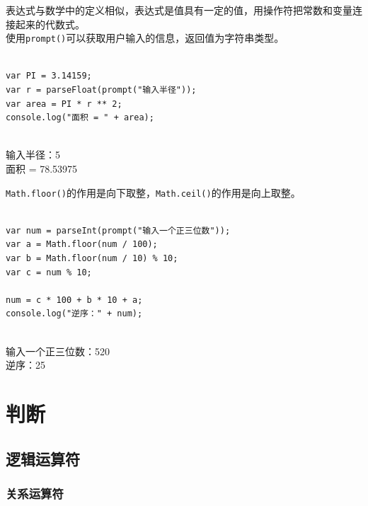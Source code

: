 表达式与数学中的定义相似，表达式是值具有一定的值，用操作符把常数和变量连接起来的代数式。 \\

使用\lstinline|prompt()|可以获取用户输入的信息，返回值为字符串类型。 \\

 \\

\begin{lstlisting}[style=htmlcssjs]
var PI = 3.14159;
var r = parseFloat(prompt("输入半径"));
var area = PI * r ** 2;
console.log("面积 = " + area);
\end{lstlisting}

\begin{tcolorbox}
	 \\
	输入半径：5 \\
	面积 = 78.53975
\end{tcolorbox}

\lstinline|Math.floor()|的作用是向下取整，\lstinline|Math.ceil()|的作用是向上取整。 \\

 \\

\begin{lstlisting}[style=htmlcssjs]
var num = parseInt(prompt("输入一个正三位数"));
var a = Math.floor(num / 100);
var b = Math.floor(num / 10) % 10;
var c = num % 10;

num = c * 100 + b * 10 + a;
console.log("逆序：" + num);
\end{lstlisting}

\begin{tcolorbox}
	 \\
	输入一个正三位数：520 \\
	逆序：25
\end{tcolorbox}

\newpage

\chapter{判断}

\section{逻辑运算符}

\subsection{关系运算符}

